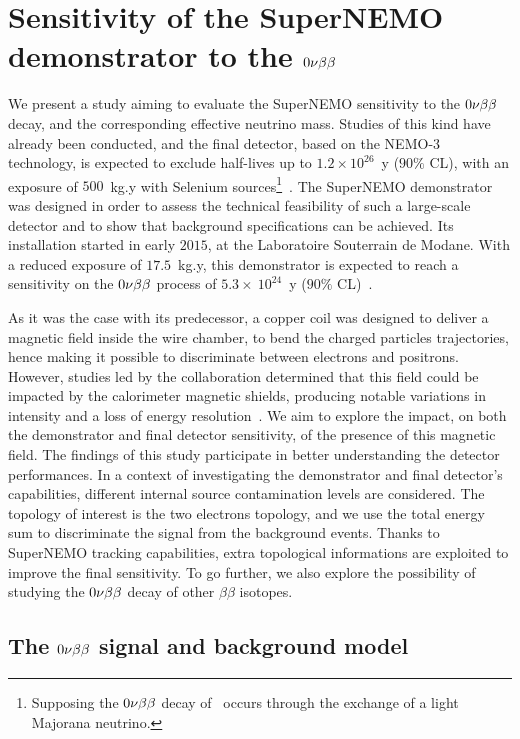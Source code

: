 \chapter{Sensitivity of the SuperNEMO demonstrator to the $0\nu\beta\beta$}
\label{ch:sensitivity}

We present a study aiming to evaluate the SuperNEMO sensitivity to the $0\nu\beta\beta$ decay, and the corresponding effective neutrino mass.
Studies of this kind have already been conducted, and the final detector, based on the NEMO-$3$ technology, is expected to exclude half-lives up to $1.2\times 10^{26}$~y ($90\%$ CL), with an exposure of $500$~kg.y with Selenium sources\footnote{Supposing the $0\nu\beta\beta$ decay of \Se\ occurs through the exchange of a light Majorana neutrino.}~\cite{art:SuperNEMO2010}.
The SuperNEMO demonstrator was designed in order to assess the technical feasibility of such a large-scale detector and to show that background specifications can be achieved.
Its installation started in early $2015$, at the Laboratoire Souterrain de Modane.
With a reduced exposure of $17.5$~kg.y, this demonstrator is expected to reach a sensitivity on the $0\nu\beta\beta$ process of $5.3\times~10^{24}$~y ($90\%$ CL)~\cite{CalvezThesis}.

As it was the case with its predecessor, a copper coil was designed to deliver a magnetic field inside the wire chamber, to bend the charged particles trajectories, hence making it possible to discriminate between electrons and positrons.
However, studies led by the collaboration determined that this field could be impacted by the calorimeter magnetic shields, producing notable variations in intensity and a loss of energy resolution~\cite{CalvezThesis}\cite{internal:magnetic_field}.
We aim to explore the impact, on both the demonstrator and final detector sensitivity, of the presence of this magnetic field.
The findings of this study participate in better understanding the detector performances.
In a context of investigating the demonstrator and final detector's capabilities, different internal source contamination levels are considered.
The topology of interest is the two electrons topology, and we use the total energy sum to discriminate the signal from the background events.
Thanks to SuperNEMO tracking capabilities, extra topological informations are exploited to improve the final sensitivity.
To go further, we also explore the possibility of studying the $0\nu\beta\beta$ decay of other $\beta\beta$ isotopes.

\section{The $0\nu\beta\beta$ signal and background model}
\label{sec:sensitivity_simus}


